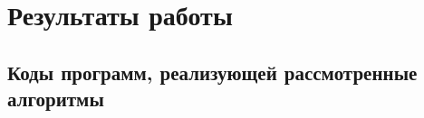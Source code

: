 \documentclass[bachelor, och, labwork]{shiza}
\begin{document}


        
            




\section{Результаты работы}
    
    \subsection{Коды программ, реализующей рассмотренные алгоритмы}


        \inputminted[fontsize=\small]{Python}{code/aua-lab3.py}
\end{document}
